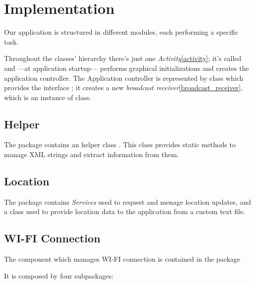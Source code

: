 \section{Implementation}
\label{sec:implementation}

Our application is structured in different modules, each performing a specific task.

Throughout the classes' hierarchy there's just one \textit{Activity}\ref{activity}; it's called  and —at application startup— performs graphical initializations and creates the application controller. The Application controller is represented by  class which provides the interface ; it creates a new \textit{broadcast receiver}\ref{broadcast_receiver}, which is an instance of  class.

\subsection{Helper}
The package  contains an helper class . This class provides static methods to manage XML strings and extract information from them.

\subsection{Location}

The package  contains \textit{Services} used to request and menage location updates, and a  class used to provide location data to the application from a custom text file.

\subsection{WI-FI Connection}
The component which manages WI-FI connection is contained in the package
\begin{center}
\end{center} 
It is composed by four subpackages:
	\\
